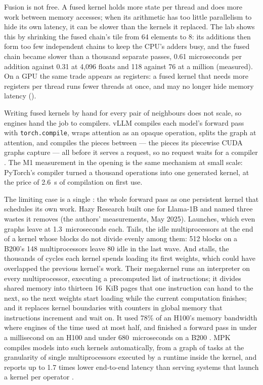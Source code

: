 
Fusion is not free. A fused kernel holds more state per thread and does more
work between memory accesses; when its arithmetic has too little parallelism
to hide its own latency, it can be slower than the kernels it replaced. The
lab shows this by shrinking the fused chain's tile from 64 elements to 8: its
additions then form too few independent chains to keep the CPU's adders busy,
and the fused chain became slower than a thousand separate passes, 0.61
microseconds per addition against 0.31 at 4,096 floats and 118 against 76 at a
million (measured). On a GPU the same trade appears as registers: a fused
kernel that needs more registers per thread runs fewer threads at once, and
may no longer hide memory latency ().

Writing fused kernels by hand for every pair of neighbours does not scale, so
engines hand the job to compilers. vLLM compiles each model's forward pass
with \texttt{torch.compile}, wraps attention as an opaque operation, splits
the graph at attention, and compiles the pieces between --- the pieces its
piecewise CUDA graphs capture --- all before it serves a request, so no request
waits for a compiler \cite{vllm2025torchcompile}. The M1 measurement in the
opening is the same mechanism at small scale: PyTorch's compiler turned a
thousand operations into one generated kernel, at the price of 2.6~s of
compilation on first use.

The limiting case is a single : the whole forward pass as one
persistent kernel that schedules its own work. Hazy Research built one for
Llama-1B and named three wastes it removes (the authors' measurements, May
2025). Launches, which even graphs leave at 1.3~microseconds each. Tails, the
idle multiprocessors at the end of a kernel whose blocks do not divide evenly
among them: 512 blocks on a B200's 148 multiprocessors leave 80 idle in the
last wave. And stalls, the thousands of cycles each kernel spends loading its
first weights, which could have overlapped the previous kernel's work. Their
megakernel runs an interpreter on every multiprocessor, executing a
precomputed list of instructions; it divides shared memory into thirteen
16~KiB pages that one instruction can hand to the next, so the next weights
start loading while the current computation finishes; and it replaces kernel
boundaries with counters in global memory that instructions increment and
wait on. It used 78\% of an H100's memory bandwidth where engines of the time
used at most half, and finished a forward pass in under a millisecond on an
H100 and under 680~microseconds on a B200 \cite{spector2025megakernel}. MPK
compiles models into such kernels automatically, from a graph of tasks at the
granularity of single multiprocessors executed by a runtime inside the kernel,
and reports up to 1.7 times lower end-to-end latency than serving systems that
launch a kernel per operator \cite{cheng2025mpk}.

